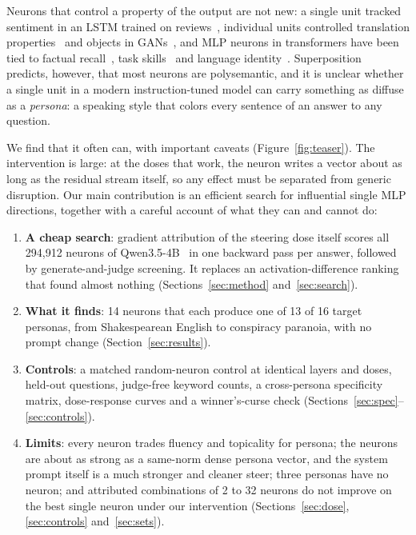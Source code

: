 \documentclass[11pt]{article}
\begin{document}
Neurons that control a property of the output are not new: a single unit tracked sentiment in an LSTM trained on reviews~\citep{radford2017learning}, individual units controlled translation properties~\citep{bau2019identifying} and objects in GANs~\citep{bau2020units}, and MLP neurons in transformers have been tied to factual recall~\citep{dai2022knowledge}, task skills~\citep{wang2022skill} and language identity~\citep{tang2024language}. Superposition~\citep{elhage2022superposition} predicts, however, that most neurons are polysemantic, and it is unclear whether a single unit in a modern instruction-tuned model can carry something as diffuse as a \emph{persona}: a speaking style that colors every sentence of an answer to any question.

We find that it often can, with important caveats (Figure~\ref{fig:teaser}). The intervention is large: at the doses that work, the neuron writes a vector about as long as the residual stream itself, so any effect must be separated from generic disruption. Our main contribution is an efficient search for influential single MLP directions, together with a careful account of what they can and cannot do:
\begin{enumerate}[leftmargin=*]
\item \textbf{A cheap search}: gradient attribution of the steering dose itself scores all 294,912 neurons of Qwen3.5-4B~\citep{qwen35_4b} in one backward pass per answer, followed by generate-and-judge screening. It replaces an activation-difference ranking that found almost nothing (Sections~\ref{sec:method} and~\ref{sec:search}).
\item \textbf{What it finds}: 14 neurons that each produce one of 13 of 16 target personas, from Shakespearean English to conspiracy paranoia, with no prompt change (Section~\ref{sec:results}).
\item \textbf{Controls}: a matched random-neuron control at identical layers and doses, held-out questions, judge-free keyword counts, a cross-persona specificity matrix, dose-response curves and a winner's-curse check (Sections~\ref{sec:spec}--\ref{sec:controls}).
\item \textbf{Limits}: every neuron trades fluency and topicality for persona; the neurons are about as strong as a same-norm dense persona vector, and the system prompt itself is a much stronger and cleaner steer; three personas have no neuron; and attributed combinations of 2 to 32 neurons do not improve on the best single neuron under our intervention (Sections~\ref{sec:dose}, \ref{sec:controls} and~\ref{sec:sets}).
\end{enumerate}
\end{document}

